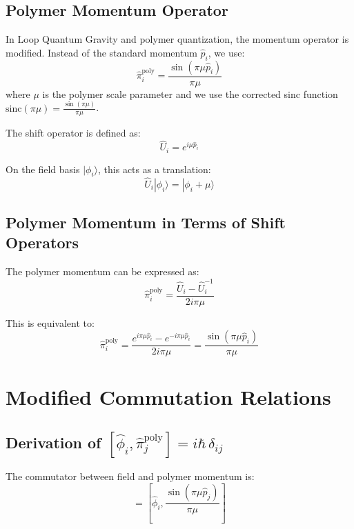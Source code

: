 \documentclass[12pt]{article}
\begin{document}
\subsection{Polymer Momentum Operator}

In Loop Quantum Gravity and polymer quantization, the momentum operator is modified. Instead of the standard momentum $\hat{p}_i$, we use:
\begin{equation}
\hat{\pi}_i^{\text{poly}} = \frac{\sin(\pi\mu \hat{p}_i)}{\pi\mu}
\end{equation}
where $\mu$ is the polymer scale parameter and we use the corrected sinc function $\mathrm{sinc}(\pi\mu) = \frac{\sin(\pi\mu)}{\pi\mu}$.

The shift operator is defined as:
\begin{equation}
\hat{U}_i = e^{i\mu \hat{p}_i}
\end{equation}

On the field basis $|\phi_i\rangle$, this acts as a translation:
\begin{equation}
\hat{U}_i |\phi_i\rangle = |\phi_i + \mu\rangle
\end{equation}

\subsection{Polymer Momentum in Terms of Shift Operators}

The polymer momentum can be expressed as:
\begin{equation}
\hat{\pi}_i^{\text{poly}} = \frac{\hat{U}_i - \hat{U}_i^{-1}}{2i\pi\mu}
\end{equation}

This is equivalent to:
\begin{equation}
\hat{\pi}_i^{\text{poly}} = \frac{e^{i\pi\mu \hat{p}_i} - e^{-i\pi\mu \hat{p}_i}}{2i\pi\mu} = \frac{\sin(\pi\mu \hat{p}_i)}{\pi\mu}
\end{equation}

\section{Modified Commutation Relations}

\subsection{Derivation of $[\hat{\phi}_i, \hat{\pi}_j^{\text{poly}}] = i\hbar\,\delta_{ij}$}

The commutator between field and polymer momentum is:
\begin{equation}
[\hat{\phi}_i, \hat{\pi}_j^{\text{poly}}] = [\hat{\phi}_i, \frac{\sin(\pi\mu \hat{p}_j)}{\pi\mu}]
\end{equation}
\end{document}
